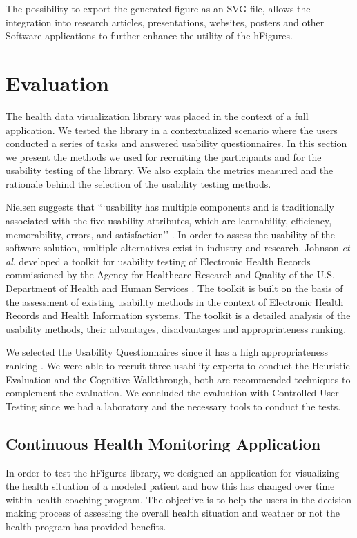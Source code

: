 \documentclass[twocolumn]{bmcart}%
\begin{document}
The possibility to export the generated figure as an SVG file, allows the integration into research articles, presentations, websites, posters and other Software applications to further enhance the utility of the hFigures.

\section*{Evaluation}

The health data visualization library was placed in the context of a full application. We tested the library in a contextualized scenario where the users conducted a series of tasks and answered usability questionnaires. In this section we present the methods we used for recruiting the participants and for the usability testing of the library. We also explain the metrics measured and the rationale behind the selection of the usability testing methods.

Nielsen suggests that ```usability has multiple components and is traditionally associated with the five usability attributes, which are learnability, efficiency, memorability, errors, and satisfaction'' \cite{nielsen1994usability}. In order to assess the usability of the software solution, multiple alternatives exist in industry and research. Johnson \textit{et al}. developed a toolkit for usability testing of Electronic Health Records commissioned by the Agency for Healthcare Research and Quality of the U.S. Department of Health and Human Services \cite{johnson2011ehr}. The toolkit is built on the basis of the assessment of existing usability methods in the context of Electronic Health Records and Health Information systems. The toolkit is a detailed analysis of the usability methods, their advantages, disadvantages and appropriateness ranking.

We selected the Usability Questionnaires since it has a high appropriateness ranking \cite{johnson2011ehr}. We were able to recruit three usability experts to conduct the Heuristic Evaluation and the Cognitive Walkthrough, both are recommended techniques to complement the evaluation. We concluded the evaluation with Controlled User Testing since we had a laboratory and the necessary tools to conduct the tests.

\subsection*{Continuous Health Monitoring Application}

In order to test the hFigures library, we designed an application for visualizing the health situation of a modeled patient and how this has changed over time within health coaching program. The objective is to help the users in the decision making process of assessing the overall health situation and weather or not the health program has provided benefits.
\end{document}
